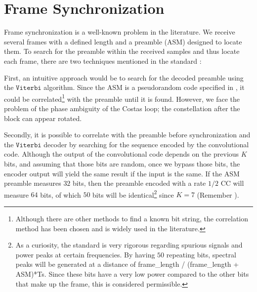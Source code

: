 \chapter{Frame Synchronization} \label{ch:Frame_sync}

Frame synchronization is a well-known problem in the literature. We receive several frames with a defined length and a preamble (ASM) designed to locate them. To search for the preamble within the received samples and thus locate each frame, there are two techniques mentioned in the standard \autocite{CCSDS_130_1_G_3}:

First, an intuitive approach would be to search for the decoded preamble using the $\mathtt{Viterbi}$ algorithm. Since the ASM is a pseudorandom code specified in \autocite{CCSDS_131_0_B_5}, it could be correlated\footnote{Although there are other methods to find a known bit string, the correlation method has been chosen and is widely used in the literature.} with the preamble until it is found. However, we face the problem of the phase ambiguity of the Costas loop; the constellation after the block can appear rotated. 

Secondly, it is possible to correlate with the preamble before synchronization and the $\mathtt{Viterbi}$ decoder by searching for the sequence encoded by the convolutional code. Although the output of the convolutional code depends on the previous $K$ bits, and assuming that those bits are random, once we bypass those bits, the encoder output will yield the same result if the input is the same. If the ASM preamble measures $32$ bits, then the preamble encoded with a rate $1/2$ CC will measure $64$ bits, of which $50$ bits will be identical\footnote{As a curiosity, the standard is very rigorous regarding spurious signals and power peaks at certain frequencies. By having $50$ repeating bits, spectral peaks will be generated at a distance of frame\_length / (frame\_length + ASM)*Ts. Since these bits have a very low power compared to the other bits that make up the frame, this is considered permissible.} since $K=7$ (Remember ). 

